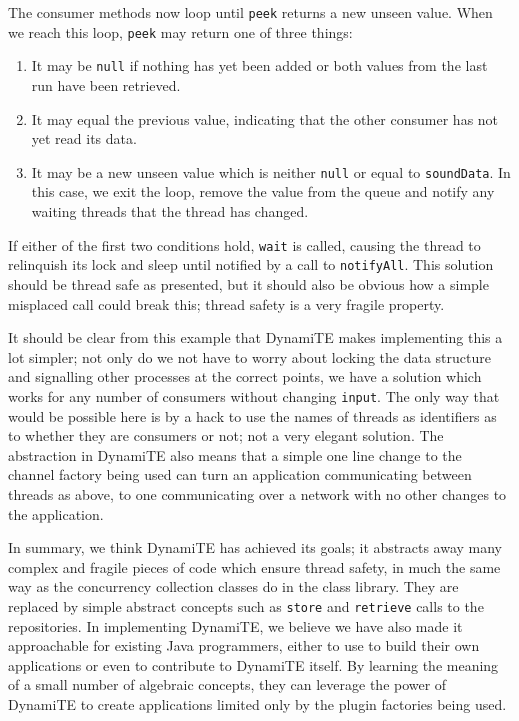 The consumer methods now loop until \texttt{peek} returns a new unseen
value.  When we reach this loop, \texttt{peek} may return one of three
things:

\begin{enumerate}
\item It may be \texttt{null} if nothing has yet been added or both
  values from the last run have been retrieved.
\item It may equal the previous value, indicating that the other
  consumer has not yet read its data.
\item It may be a new unseen value which is neither \texttt{null} or
  equal to \texttt{soundData}.  In this case, we exit the loop, remove
  the value from the queue and notify any waiting threads that the
  thread has changed.
\end{enumerate}

If either of the first two conditions hold, \texttt{wait} is called,
causing the thread to relinquish its lock and sleep until notified by
a call to \texttt{notifyAll}.  This solution should be thread safe as
presented, but it should also be obvious how a simple misplaced call
could break this; thread safety is a very fragile property.

It should be clear from this example that DynamiTE makes implementing
this a lot simpler; not only do we not have to worry about locking the
data structure and signalling other processes at the correct points,
we have a solution which works for any number of consumers without
changing \texttt{input}.  The only way that would be possible here is
by a hack to use the names of threads as identifiers as to whether
they are consumers or not; not a very elegant solution.  The
abstraction in DynamiTE also means that a simple one line change to
the channel factory being used can turn an application communicating
between threads as above, to one communicating over a network with no
other changes to the application.

In summary, we think DynamiTE has achieved its goals; it abstracts
away many complex and fragile pieces of code which ensure thread
safety, in much the same way as the concurrency collection classes do
in the class library.  They are replaced by simple abstract concepts
such as \texttt{store} and \texttt{retrieve} calls to the repositories.
In implementing DynamiTE, we believe we have also made it approachable
for existing Java programmers, either to use to build their own
applications or even to contribute to DynamiTE itself.  By learning
the meaning of a small number of algebraic concepts, they can leverage
the power of DynamiTE to create applications limited only by the
plugin factories being used.


